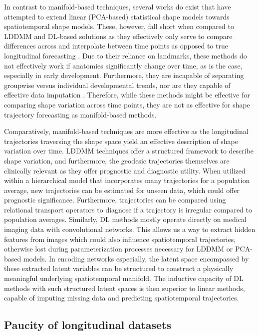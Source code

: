 		In contrast to manifold-based techniques, several works do exist that have attempted to extend linear (PCA-based) statistical shape models towards spatiotemporal shape models. These, however, fall short when compared to LDDMM and DL-based solutions as they effectively only serve to compare differences across and interpolate between time points as opposed to true longitudinal forecasting \cite{Hamarneh2004, Kasahara2018, BinteAlam2020, Saito2019}. Due to their reliance on landmarks, these methods do not effectively work if anatomies significantly change over time, as is the case, especially in early development. Furthermore, they are incapable of separating groupwise versus individual developmental trends, nor are they capable of effective data imputation \cite{Adams2023}. Therefore, while these methods might be effective for comparing shape variation across time points, they are not as effective for shape trajectory forecasting as manifold-based methods. 
	
		Comparatively, manifold-based techniques are more effective as the longitudinal trajectories traversing the shape space yield an effective description of shape variation over time. LDDMM techniques offer a structured framework to describe shape variation, and furthermore, the geodesic trajectories themselves are clinically relevant as they offer prognostic and diagnostic utility. When utilized within a hierarchical model that incorporates many trajectories for a population average, new trajectories can be estimated for unseen data, which could offer prognostic significance. Furthermore, trajectories can be compared using relational transport operators to diagnose if a trajectory is irregular compared to population averages. Similarly, DL methods mostly operate directly on medical imaging data with convolutional networks. This allows us a way to extract hidden features from images which could also influence spatiotemporal trajectories, otherwise lost during parameterization processes necessary for LDDMM or PCA-based models. In encoding networks especially, the latent space encompassed by these extracted latent variables can be structured to construct a physically meaningful underlying spatiotemporal manifold. The inductive capacity of DL methods with such structured latent spaces is then superior to linear methods, capable of imputing missing data and predicting spatiotemporal trajectories. 
			
	\subsection{Paucity of longitudinal datasets}	
			
